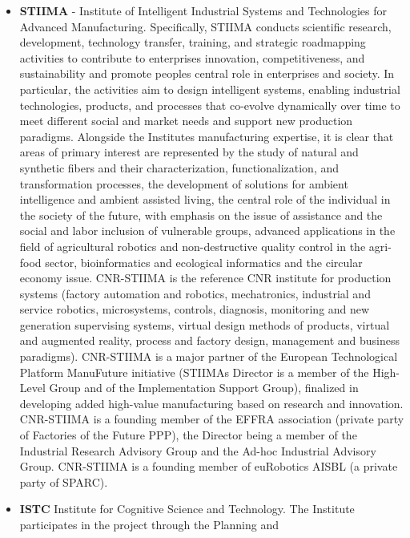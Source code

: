 \begin{itemize}
\item
  \textbf{STIIMA} - Institute of Intelligent Industrial Systems and
  Technologies for Advanced Manufacturing. Specifically, STIIMA conducts
  scientific research, development, technology transfer, training, and
  strategic roadmapping activities to contribute to
  enterprises\textquotesingle{} innovation, competitiveness, and
  sustainability and promote people\textquotesingle s central role in
  enterprises and society. In particular, the activities aim to design
  intelligent systems, enabling industrial technologies, products, and
  processes that co-evolve dynamically over time to meet different
  social and market needs and support new production paradigms.
  Alongside the Institute\textquotesingle s manufacturing expertise, it
  is clear that areas of primary interest are represented by the study
  of natural and synthetic fibers and their characterization,
  functionalization, and transformation processes, the development of
  solutions for ambient intelligence and ambient assisted living, the
  central role of the individual in the society of the future, with
  emphasis on the issue of assistance and the social and labor inclusion
  of vulnerable groups, advanced applications in the field of
  agricultural robotics and non-destructive quality control in the
  agri-food sector, bioinformatics and ecological informatics and the
  circular economy issue. CNR-STIIMA is the reference CNR institute for
  production systems (factory automation and robotics, mechatronics,
  industrial and service robotics, microsystems, controls, diagnosis,
  monitoring and new generation supervising systems, virtual design
  methods of products, virtual and augmented reality, process and
  factory design, management and business paradigms). CNR-STIIMA is a
  major partner of the European Technological Platform ManuFuture
  initiative (STIIMA\textquotesingle s Director is a member of the
  High-Level Group and of the Implementation Support Group), finalized
  in developing added high-value manufacturing based on research and
  innovation. CNR-STIIMA is a founding member of the EFFRA association
  (private party of Factories of the Future PPP), the Director being a
  member of the Industrial Research Advisory Group and the Ad-hoc
  Industrial Advisory Group. CNR-STIIMA is a founding member of
  euRobotics AISBL (a private party of SPARC).
\item
  \textbf{ISTC} Institute for Cognitive Science and Technology. The
  Institute participates in the project through the Planning and

\end{itemize}
